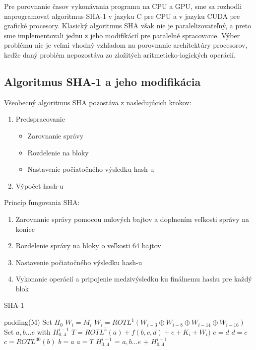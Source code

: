 \documentclass[conference]{IEEEtran}
\begin{document}
Pre porovnanie časov vykonávania programu na CPU a GPU, sme sa rozhodli naprogramovať algoritmus SHA-1 v jazyku C pre CPU a v jazyku CUDA pre grafické procesory. Klasický algoritmus SHA však nie je paralelizovateľný, a preto sme implementovali jednu z jeho modifikácií pre paralelné spracovanie. Výber problému nie je veľmi vhodný vzhľadom na porovnanie architektúry procesorov, keďže daný problém nepozostáva zo zložitých aritmeticko-logických operácií.

\subsection{Algoritmus SHA-1 a jeho modifikácia}

Všeobecný algoritmus SHA pozostáva z nasledujúcich krokov:

\begin{enumerate}
	\item{Predspracovanie}
	\begin{itemize}
		\item{Zarovnanie správy}
		\item{Rozdelenie na bloky}
		\item{Nastavenie počiatočného výsledku hash-u}\\
	\end{itemize}
	\item{Výpočet hash-u}
\end{enumerate}

Princíp fungovania SHA: 
\begin{enumerate}
	\item{Zarovnanie správy pomocou nulových bajtov a doplnením veľkosti správy na koniec}
	\item{Rozdelenie správy na bloky o veľkosti 64 bajtov}
	\item{Nastavenie počiatočného výsledku hash-u}
	\item{Vykonanie operácií a pripojenie medzivýsledku ku finálnemu hashu pre každý blok}
\end{enumerate}

\begin{algorithm}
   \caption{SHA-1 \cite{sha-algo}}
    \begin{algorithmic}[1]

        \State padding(M) 
        \State  Set ${H_0}$ 
     	 
     			\State $W_i = M_i$
     		\EndFor
     			\State $W_i = ROTL^1(W_{i-3} \oplus W_{i-8} \oplus W_{i-14} \oplus W_{i-16})$
     		\EndFor
		\State Set ${a, b \ldots e}$ with ${H_{0..4}^{i-1}}$
		 
			\State  $T = ROTL^5(a) + f(b,c,d) + e + K_i + W_i)$
			\State  $e = d$
			\State  $d = c$
			\State  $c = ROTL^{30}(b)$
			\State  $b = a$
			\State  $a = T$
     		\EndFor		
     	\EndFor
   	\State ${H_{0..4}^{i-1}}$ = ${a, b \ldots e}$ + ${H_{0..4}^{i-1}}$
       \EndFunction
\end{algorithmic}
\end{algorithm}
\end{document}
